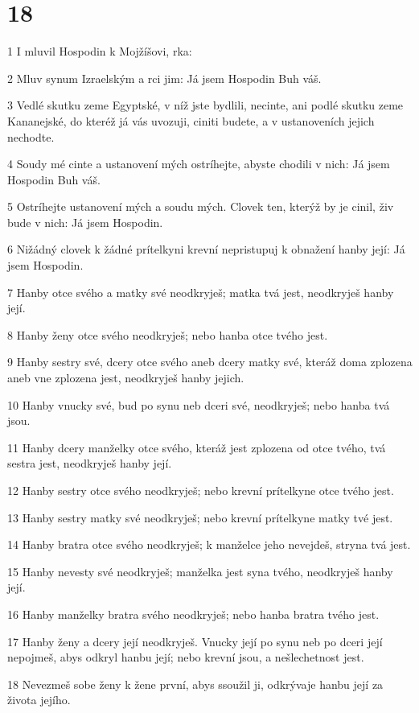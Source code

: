 \chapter{18}

\par 1 I mluvil Hospodin k Mojžíšovi, rka:
\par 2 Mluv synum Izraelským a rci jim: Já jsem Hospodin Buh váš.
\par 3 Vedlé skutku zeme Egyptské, v níž jste bydlili, necinte, ani podlé skutku zeme Kananejské, do kteréž já vás uvozuji, ciniti budete, a v ustanoveních jejich nechodte.
\par 4 Soudy mé cinte a ustanovení mých ostríhejte, abyste chodili v nich: Já jsem Hospodin Buh váš.
\par 5 Ostríhejte ustanovení mých a soudu mých. Clovek ten, kterýž by je cinil, živ bude v nich: Já jsem Hospodin.
\par 6 Nižádný clovek k žádné prítelkyni krevní nepristupuj k obnažení hanby její: Já jsem Hospodin.
\par 7 Hanby otce svého a matky své neodkryješ; matka tvá jest, neodkryješ hanby její.
\par 8 Hanby ženy otce svého neodkryješ; nebo hanba otce tvého jest.
\par 9 Hanby sestry své, dcery otce svého aneb dcery matky své, kteráž doma zplozena aneb vne zplozena jest, neodkryješ hanby jejich.
\par 10 Hanby vnucky své, bud po synu neb dceri své, neodkryješ; nebo hanba tvá jsou.
\par 11 Hanby dcery manželky otce svého, kteráž jest zplozena od otce tvého, tvá sestra jest, neodkryješ hanby její.
\par 12 Hanby sestry otce svého neodkryješ; nebo krevní prítelkyne otce tvého jest.
\par 13 Hanby sestry matky své neodkryješ; nebo krevní prítelkyne matky tvé jest.
\par 14 Hanby bratra otce svého neodkryješ; k manželce jeho nevejdeš, stryna tvá jest.
\par 15 Hanby nevesty své neodkryješ; manželka jest syna tvého, neodkryješ hanby její.
\par 16 Hanby manželky bratra svého neodkryješ; nebo hanba bratra tvého jest.
\par 17 Hanby ženy a dcery její neodkryješ. Vnucky její po synu neb po dceri její nepojmeš, abys odkryl hanbu její; nebo krevní jsou, a nešlechetnost jest.
\par 18 Nevezmeš sobe ženy k žene první, abys ssoužil ji, odkrývaje hanbu její za života jejího.
